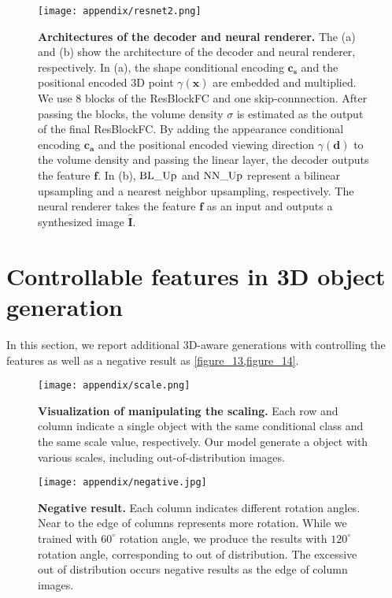 \documentclass[nohyperref]{article}
\theoremstyle{plain}
\theoremstyle{definition}
\theoremstyle{remark}
\begin{document}
\begin{figure}[h]
\begin{center}
\centerline{\texttt{[image: appendix/resnet2.png]}}
\caption{\textbf{Architectures of the decoder and neural renderer.} The (a) and (b) show the architecture of the decoder and neural renderer, respectively. In (a), the shape conditional encoding $\textbf{c}_{\textbf{s}}$ and the positional encoded 3D point $\gamma(\textbf{x})$ are embedded and multiplied. We use 8 blocks of the ResBlockFC and one skip-connnection. After passing the blocks, the volume density $\sigma$ is estimated as the output of the final ResBlockFC. By adding the appearance conditional encoding $\textbf{c}_{\textbf{a}}$ and the positional encoded viewing direction $\gamma(\textbf{d})$ to the volume density and passing the linear layer, the decoder outputs the feature $\textbf{f}$. In (b), $\textnormal{BL\_Up}$ and $\textnormal{NN\_Up}$ represent a bilinear upsampling and a nearest neighbor upsampling, respectively. The neural renderer takes the feature $\textbf{f}$ as an input and outputs a synthesized image $\hat{\textbf{I}}$.}
\label{figure_12}
\end{center}
\vskip -0.2in
\end{figure}
\clearpage
\newpage

\section{Controllable features in 3D object generation}
In this section, we report additional 3D-aware generations with controlling the features as well as a negative result as \cref{figure_13,figure_14}.


\begin{figure}[h]
\begin{center}
\centerline{\texttt{[image: appendix/scale.png]}}
\caption{\textbf{Visualization of manipulating the scaling.} Each row and column indicate a single object with the same conditional class and the same scale value, respectively. Our model generate a object with various scales, including out-of-distribution images.}
\label{figure_13}
\end{center}
\vskip -0.2in
\end{figure}




\begin{figure}[h]
\begin{center}
\centerline{\texttt{[image: appendix/negative.jpg]}}
\caption{\textbf{Negative result.} Each column indicates different rotation angles. Near to the edge of columns represents more rotation. While we trained with $60^{\circ}$ rotation angle, we produce the results with $120^{\circ}$ rotation angle, corresponding to out of distribution. The excessive out of distribution occurs negative results as the edge of column images.}
\label{figure_14}
\end{center}
\vskip -0.2in
\end{figure}
\clearpage
\newpage
\end{document}
